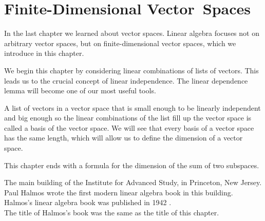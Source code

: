 
\chapter{Finite-Dimensional Vector~Spaces} \label{fin-dimVS}  %

In the last chapter we learned about vector spaces.  Linear algebra focuses not on arbitrary vector spaces, but on finite-dimensional vector spaces, which we introduce in this chapter.

We begin this chapter by considering linear combinations of lists of vectors. This leads us to the crucial concept of linear independence. The linear dependence lemma will become one of our most useful tools.

A list of vectors in a vector space that is small enough to be linearly independent and big enough so the linear combinations of the list fill up the vector space is called a basis of the vector space. We will see that every basis of a vector space has the same length, which will allow us to define the dimension of a vector space.

This chapter ends with a formula for the dimension of the sum of two subspaces.

%
{The main building of the Institute for Advanced Study, in Princeton, New Jersey.\\Paul Halmos  wrote the first modern linear algebra book in this building.\\Halmos's linear algebra book was published in 1942 .\\The title of Halmos's book was the same as the title of this
chapter.}


